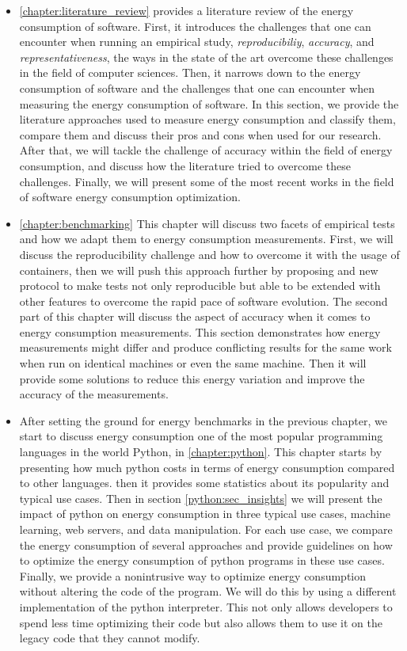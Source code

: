 \begin{itemize}
    \item \cref{chapter:literature_review} provides a literature review of the energy consumption of software. First, it introduces the challenges that one can encounter when running an empirical study, \emph{reproducibiliy}, \emph{accuracy}, and \emph{representativeness}, the ways in the state of the art overcome these challenges in the field of computer sciences. Then, it narrows down to the energy consumption of software and the challenges that one can encounter when measuring the energy consumption of software. In this section, we provide the literature approaches used to measure energy consumption and classify them, compare them and discuss their pros and cons when used for our research. After that, we will tackle the challenge of accuracy within the field of energy consumption, and discuss how the literature tried to overcome these challenges. Finally, we will present some of the most recent works in the field of software energy consumption optimization.
    \item \cref{chapter:benchmarking} This chapter will discuss two facets of empirical tests and how we adapt them to energy consumption measurements. First, we will discuss the reproducibility challenge and how to overcome it with the usage of containers, then we will push this approach further by proposing and new protocol to make tests not only reproducible but able to be extended with other features to overcome the rapid pace of software evolution. The second part of this chapter will discuss the aspect of accuracy when it comes to energy consumption measurements. This section demonstrates how energy measurements might differ and produce conflicting results for the same work when run on identical machines or even the same machine. Then it will provide some solutions to reduce this energy variation and improve the accuracy of the measurements.
    \item After setting the ground for energy benchmarks in the previous chapter, we start to discuss energy consumption one of the most popular programming languages in the world Python, in \cref{chapter:python}. This chapter starts by presenting how much python costs in terms of energy consumption compared to other languages. then it provides some statistics about its popularity and typical use cases. Then in section \ref{python:sec_insights} we will present the impact of python on energy consumption in three typical use cases, machine learning, web servers, and data manipulation. For each use case, we compare the energy consumption of several approaches and provide guidelines on how to optimize the energy consumption of python programs in these use cases. Finally, we provide a nonintrusive way to optimize energy consumption without altering the code of the program. We will do this by using a different implementation of the python interpreter. This not only allows developers to spend less time optimizing their code but also allows them to use it on the legacy code that they cannot modify.

\end{itemize}
